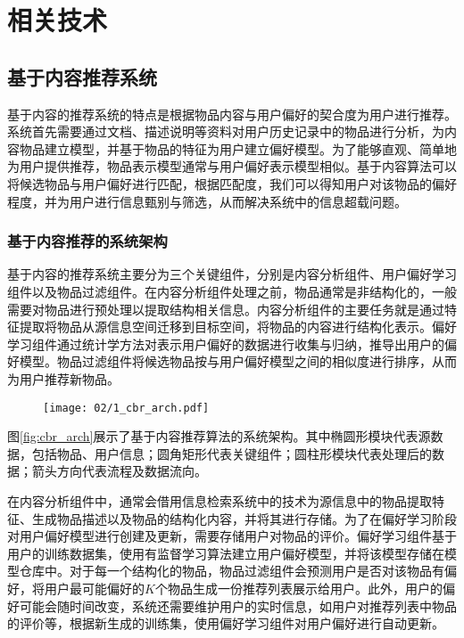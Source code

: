 \chapter{相关技术}
\label{chap:related}

\section{基于内容推荐系统}

基于内容的推荐系统的特点是根据物品内容与用户偏好的契合度为用户进行推荐\cite{lops2011content}。系统首先需要通过文档、描述说明等资料对用户历史记录中的物品进行分析，为内容物品建立模型，并基于物品的特征为用户建立偏好模型。为了能够直观、简单地为用户提供推荐，物品表示模型通常与用户偏好表示模型相似。基于内容算法可以将候选物品与用户偏好进行匹配，根据匹配度，我们可以得知用户对该物品的偏好程度，并为用户进行信息甄别与筛选，从而解决系统中的信息超载问题。

\subsection{基于内容推荐的系统架构}

基于内容的推荐系统主要分为三个关键组件，分别是内容分析组件、用户偏好学习组件以及物品过滤组件。在内容分析组件处理之前，物品通常是非结构化的，一般需要对物品进行预处理以提取结构相关信息。内容分析组件的主要任务就是通过特征提取将物品从源信息空间迁移到目标空间，将物品的内容进行结构化表示。偏好学习组件通过统计学方法对表示用户偏好的数据进行收集与归纳，推导出用户的偏好模型。物品过滤组件将候选物品按与用户偏好模型之间的相似度进行排序，从而为用户推荐新物品\cite{herlocker2004evaluating}。

\begin{figure}
 \centering
 \texttt{[image: 02/1\_cbr\_arch.pdf]}
\end{figure}

图\ref{fig:cbr_arch}展示了基于内容推荐算法的系统架构。其中椭圆形模块代表源数据，包括物品、用户信息；圆角矩形代表关键组件；圆柱形模块代表处理后的数据；箭头方向代表流程及数据流向。

在内容分析组件中，通常会借用信息检索系统中的技术为源信息中的物品提取特征、生成物品描述以及物品的结构化内容，并将其进行存储。为了在偏好学习阶段对用户偏好模型进行创建及更新，需要存储用户对物品的评价。偏好学习组件基于用户的训练数据集，使用有监督学习算法建立用户偏好模型，并将该模型存储在模型仓库中。对于每一个结构化的物品，物品过滤组件会预测用户是否对该物品有偏好，将用户最可能偏好的$K$个物品生成一份推荐列表展示给用户。此外，用户的偏好可能会随时间改变，系统还需要维护用户的实时信息，如用户对推荐列表中物品的评价等，根据新生成的训练集，使用偏好学习组件对用户偏好进行自动更新。

